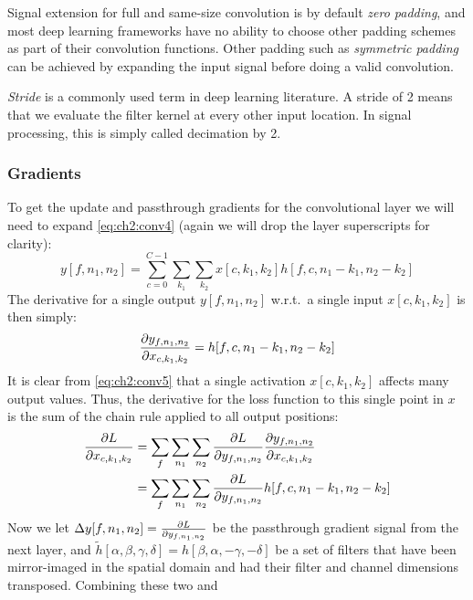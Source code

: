 Signal extension for full and same-size convolution is by default \emph{zero
padding}, and most deep learning frameworks have no ability to choose other
padding schemes as part of their convolution functions. Other padding such as
\emph{symmetric padding} can be achieved by expanding the input signal before
doing a valid convolution.

\emph{Stride} is a commonly used term in deep learning literature. A stride of 2 means
that we evaluate the filter kernel at every other input location. In signal
processing, this is simply called decimation by 2.

\subsubsection{Gradients}\label{sec:ch2:conv_grad}
To get the update and passthrough gradients for the convolutional layer we will need to expand
\eqref{eq:ch2:conv4} (again we will drop the layer superscripts for clarity):
\begin{equation}
  y[f, n_1, n_2] = \sum_{c=0}^{C-1} \sum_{k_1} \sum_{k_2} x[c, k_1, k_2]
  h[f, c, n_1-k_1, n_2-k_2] \label{eq:ch2:conv5}
\end{equation}
The derivative for a single output $y[f, n_1, n_2]$ w.r.t.\ a single input $x[c, k_1, k_2]$ is then
simply:
\begin{equation}
  \frac{\partial y_{f, n_1, n_2}}{\partial x_{c, k_1, k_2}} = h[f, c, n_1 - k_1, n_2 - k_2]
\end{equation}
It is clear from \eqref{eq:ch2:conv5} that a single activation $x[c, k_1, k_2]$ affects
many output values. Thus, the derivative for the loss function to this single
point in $x$ is the sum of the chain rule applied to all output positions:
\begin{align}
  \frac{\partial L}{\partial x_{c,k_1,k_2}} &= \sum_f \sum_{n_1} \sum_{n_2} \frac{\partial L}{\partial y_{f, n_1, n_2}}
  \frac{\partial y_{f, n_1, n_2}}{\partial x_{c,k_1,k_2}} \\
  &= \sum_f \sum_{n_1} \sum_{n_2} \frac{\partial L}{\partial y_{f, n_1, n_2}} h[f, c, n_1 - k_1, n_2 - k_2] \label{eq:ch2:conv6}
\end{align}
Now we let $\Delta y[f, n_1, n_2] = \frac{\partial L}{\partial y_{f, n_1, n_2}}$ be the passthrough gradient
signal from the next layer, and $\tilde{h}[\alpha, \beta, \gamma, \delta] = h[\beta, \alpha, -\gamma, -\delta]$
be a set of filters that have been mirror-imaged in the spatial domain and had
their filter and channel dimensions transposed. Combining these two and
